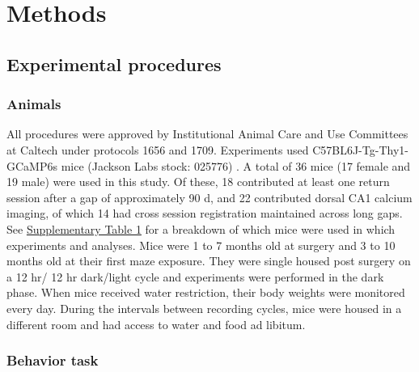 \documentclass[fleqn,10pt]{wlscirep}
\begin{document}
\newpage
\section*{Methods}

\subsection*{Experimental procedures}

\subsubsection*{Animals}

All procedures were approved by Institutional Animal Care and Use Committees at Caltech under protocols 1656 and 1709. Experiments used C57BL6J-Tg-Thy1-GCaMP6s mice (Jackson Labs stock: 025776) \cite{dana_thy1-gcamp6_2014}. A total of 36 mice (17 female and 19 male) were used in this study. Of these, 18 contributed at least one return session after a gap of approximately 90 d, and 22 contributed dorsal CA1 calcium imaging, of which 14 had cross session registration maintained across long gaps. See \hyperlink{supp-table-1}{Supplementary Table 1} for a breakdown of which mice were used in which experiments and analyses. Mice were 1 to 7 months old at surgery and 3 to 10 months old at their first maze exposure. They were single housed post surgery on a 12 hr/ 12 hr dark/light cycle and experiments were performed in the dark phase. When mice received water restriction, their body weights were monitored every day. During the intervals between recording cycles, mice were housed in a different room and had access to water and food ad libitum. 

\subsubsection*{Behavior task}
\end{document}
